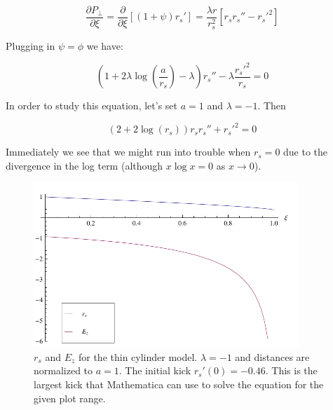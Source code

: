 \documentclass[aps,prl,preprint,groupedaddress]{revtex4-1}
\begin{document}
\begin{equation}\label{eq:EOM}
\frac{\partial P_{\perp}}{\partial \xi} = \frac{\partial}{\partial \xi}[(1+\psi)r_s'] = \frac{\lambda r}{r_s^2}[r_s r_s'' - r_s'^2] 
\end{equation}

Plugging in $\psi = \phi$ we have:

\begin{equation}\label{eq:rs}
\left(1+2\lambda\log\left(\frac{a}{r_s}\right) - \lambda\right)r_s'' -\lambda\frac{r_s'^2}{r_s} = 0
\end{equation}

In order to study this equation, let's set $a=1$ and $\lambda = -1$. Then

\begin{equation}\label{eq:rs_simp}
(2+2\log(r_s)) r_s r_s'' + r_s'^2 = 0
\end{equation}

Immediately we see that we might run into trouble when $r_s = 0$ due to the divergence in the log term (although $x\log x = 0$ as $x\rightarrow0$).

\begin{figure}[ht]\label{fig:sheath}
  \centering
    \includegraphics[width=100mm]{./figures/sheath.pdf}
      \caption{$r_s$ and $E_z$ for the thin cylinder model. $\lambda = -1$ and distances are normalized to $a=1$. The initial kick $r_s'(0) = -0.46$. This is the largest kick that Mathematica can use to solve the equation for the given plot range.}
\end{figure}
\end{document}
